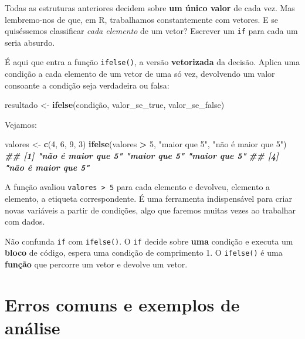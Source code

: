 \documentclass[
  portuguese,
  11pt,
  openany]{book}
\newenvironment{Shaded}{\begin{snugshade}}{\end{snugshade}}
\newcommand{\DecValTok}[1]{\textcolor[rgb]{0.00,0.00,0.81}{#1}}
\newcommand{\DocumentationTok}[1]{\textcolor[rgb]{0.56,0.35,0.01}{\textbf{\textit{#1}}}}
\newcommand{\FunctionTok}[1]{\textcolor[rgb]{0.13,0.29,0.53}{\textbf{#1}}}
\newcommand{\NormalTok}[1]{#1}
\newcommand{\OtherTok}[1]{\textcolor[rgb]{0.56,0.35,0.01}{#1}}
\newcommand{\SpecialCharTok}[1]{\textcolor[rgb]{0.81,0.36,0.00}{\textbf{#1}}}
\newcommand{\StringTok}[1]{\textcolor[rgb]{0.31,0.60,0.02}{#1}}
\begin{document}
Todas as estruturas anteriores decidem sobre \textbf{um único valor} de cada vez. Mas
lembremo-nos de que, em R, trabalhamos constantemente com vetores. E se
quiséssemos classificar \emph{cada elemento} de um vetor? Escrever um \texttt{if} para cada um
seria absurdo.

É aqui que entra a função \texttt{ifelse()}, a versão \textbf{vetorizada} da decisão. Aplica
uma condição a cada elemento de um vetor de uma só vez, devolvendo um valor
consoante a condição seja verdadeira ou falsa:

\begin{Shaded}
\begin{Highlighting}[]
\NormalTok{resultado }\OtherTok{\textless{}{-}} \FunctionTok{ifelse}\NormalTok{(condição, valor\_se\_true, valor\_se\_false)}
\end{Highlighting}
\end{Shaded}

Vejamos:

\begin{Shaded}
\begin{Highlighting}[]
\NormalTok{valores }\OtherTok{\textless{}{-}} \FunctionTok{c}\NormalTok{(}\DecValTok{4}\NormalTok{, }\DecValTok{6}\NormalTok{, }\DecValTok{9}\NormalTok{, }\DecValTok{3}\NormalTok{)}
\FunctionTok{ifelse}\NormalTok{(valores }\SpecialCharTok{\textgreater{}} \DecValTok{5}\NormalTok{, }\StringTok{"maior que 5"}\NormalTok{, }\StringTok{"não é maior que 5"}\NormalTok{)}
\DocumentationTok{\#\# [1] "não é maior que 5" "maior que 5"       "maior que 5"      }
\DocumentationTok{\#\# [4] "não é maior que 5"}
\end{Highlighting}
\end{Shaded}

A função avaliou \texttt{valores\ \textgreater{}\ 5} para cada elemento e devolveu, elemento a elemento,
a etiqueta correspondente. É uma ferramenta indispensável para criar novas
variáveis a partir de condições, algo que faremos muitas vezes ao trabalhar com
dados.

Não confunda \texttt{if} com \texttt{ifelse()}. O \texttt{if} decide sobre \textbf{uma} condição e executa
um \textbf{bloco} de código, espera uma condição de comprimento 1. O \texttt{ifelse()} é uma
\textbf{função} que percorre um vetor e devolve um vetor.

\section{Erros comuns e exemplos de análise}\label{erros-comuns-e-exemplos-de-anuxe1lise}
\end{document}
